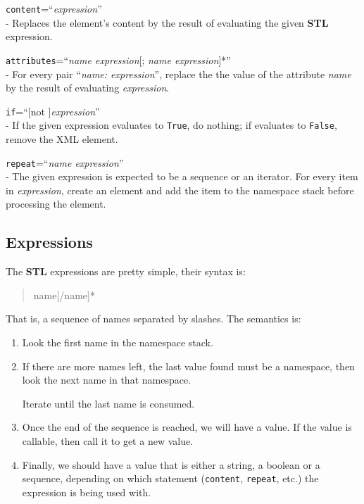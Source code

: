 \begin{api}
    {\tt content}=``{\em expression}''\\
    - Replaces the element's content by the result of evaluating the given
    {\bf STL} expression.

    {\tt attributes}=``{\em name expression}[; {\em name expression}]*''\\
    - For every pair ``{\em name: expression}'', replace the the value of
    the attribute {\em name} by the result of evaluating {\em expression}.

    {\tt if}=``[not ]{\em expression}''\\
    - If the given expression evaluates to {\tt True}, do nothing; if
    evaluates to {\tt False}, remove the XML element.

    {\tt repeat}=``{\em name expression}''\\
    - The given expression is expected to be a sequence or an iterator.
    For every item in {\em expression}, create an element and add the
    item to the namespace stack before processing the element.
\end{api}


\subsection{Expressions}

The {\bf STL} expressions are pretty simple, their syntax is:

\begin{quote}
    name[/name]*
\end{quote}

That is, a sequence of names separated by slashes. The semantics is:

\begin{enumerate}
  \item Look the first name in the namespace stack.

  \item If there are more names left, the last value found must be a namespace,
    then look the next name in that namespace.

    Iterate until the last name is consumed.

  \item Once the end of the sequence is reached, we will have a value. If
    the value is callable, then call it to get a new value.

  \item Finally, we should have a value that is either a string, a boolean
    or a sequence, depending on which statement ({\tt content}, {\tt repeat},
    etc.) the expression is being used with.
\end{enumerate}



